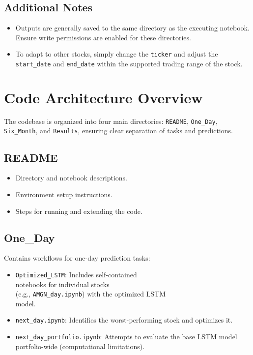 \documentclass[10pt,twocolumn]{article}
\begin{document}
\subsection{Additional Notes}

\begin{itemize}
    \item Outputs are generally saved to the same directory as the executing notebook. Ensure write permissions are enabled for these directories.
    \item To adapt to other stocks, simply change the \texttt{ticker} and adjust the \texttt{start\_date} and \texttt{end\_date} within the supported trading range of the stock.
\end{itemize}

\section{Code Architecture Overview}

The codebase is organized into four main directories: \texttt{README}, \texttt{One\_Day}, \texttt{Six\_Month}, and \texttt{Results}, ensuring clear separation of tasks and predictions.

\subsection{README}
\begin{itemize}
    \item Directory and notebook descriptions.
    \item Environment setup instructions.
    \item Steps for running and extending the code.
\end{itemize}

\subsection{One\_Day}
Contains workflows for one-day prediction tasks:
\begin{itemize}
    \item \texttt{Optimized\_LSTM}: Includes self-contained \\  notebooks for individual stocks \\ (e.g., \texttt{AMGN\_day.ipynb}) with the optimized LSTM \\ model.  
    \item \texttt{next\_day.ipynb}: Identifies the worst-performing stock and optimizes it.
    \item \texttt{next\_day\_portfolio.ipynb}: Attempts to evaluate the base LSTM model portfolio-wide (computational limitations).
\end{itemize}
\end{document}
